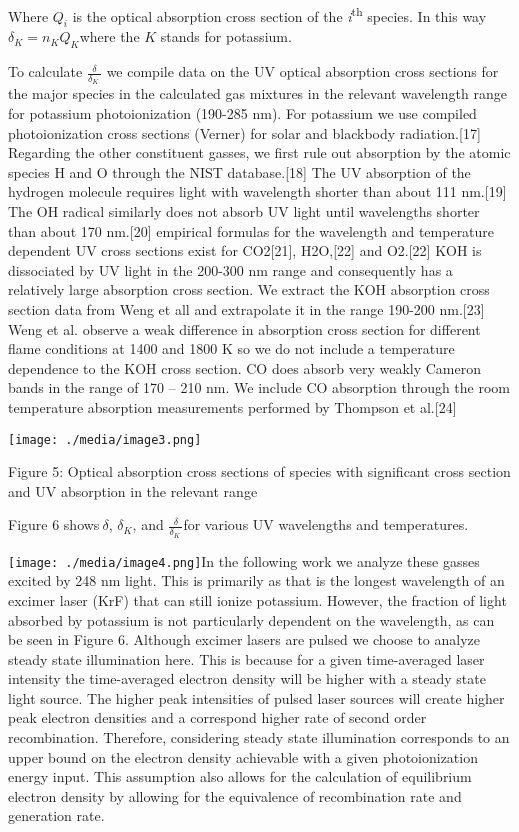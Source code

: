 Where \(Q_{i}\) is the optical absorption cross section of the \emph{i}\textsuperscript{th} species. In this way \(\delta_{K} = n_{K}Q_{K}\)where the \(K\) stands for potassium.

To calculate \(\frac{\delta}{\delta_{K}\ }\) we compile data on the UV optical absorption cross sections for the major species in the calculated gas mixtures in the relevant wavelength range for potassium photoionization (190-285 nm). For potassium we use compiled photoionization cross sections (Verner) for solar and blackbody radiation.{[}17{]} Regarding the other constituent gasses, we first rule out absorption by the atomic species H and O through the NIST database.{[}18{]} The UV absorption of the hydrogen molecule requires light with wavelength shorter than about 111 nm.{[}19{]} The OH radical similarly does not absorb UV light until wavelengths shorter than about 170 nm.{[}20{]} empirical formulas for the wavelength and temperature dependent UV cross sections exist for CO2{[}21{]}, H2O,{[}22{]} and O2.{[}22{]} KOH is dissociated by UV light in the 200-300 nm range and consequently has a relatively large absorption cross section. We extract the KOH absorption cross section data from Weng et all and extrapolate it in the range 190-200 nm.{[}23{]} Weng et al. observe a weak difference in absorption cross section for different flame conditions at 1400 and 1800 K so we do not include a temperature dependence to the KOH cross section. CO does absorb very weakly Cameron bands in the range of 170 -- 210 nm. We include CO absorption through the room temperature absorption measurements performed by Thompson et al.{[}24{]}

\texttt{[image: ./media/image3.png]}

Figure 5: Optical absorption cross sections of species with significant cross section and UV absorption in the relevant range

Figure 6 shows\(\ \delta\), \(\delta_{K}\), and \(\frac{\delta}{\delta_{K}\ }\)for various UV wavelengths and temperatures.

\texttt{[image: ./media/image4.png]}In the following work we analyze these gasses excited by 248 nm light. This is primarily as that is the longest wavelength of an excimer laser (KrF) that can still ionize potassium. However, the fraction of light absorbed by potassium is not particularly dependent on the wavelength, as can be seen in Figure 6. Although excimer lasers are pulsed we choose to analyze steady state illumination here. This is because for a given time-averaged laser intensity the time-averaged electron density will be higher with a steady state light source. The higher peak intensities of pulsed laser sources will create higher peak electron densities and a correspond higher rate of second order recombination. Therefore, considering steady state illumination corresponds to an upper bound on the electron density achievable with a given photoionization energy input. This assumption also allows for the calculation of equilibrium electron density by allowing for the equivalence of recombination rate and generation rate.



